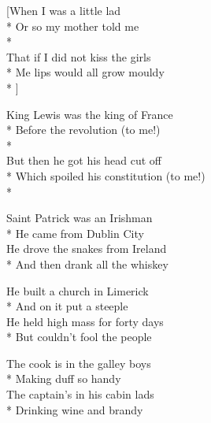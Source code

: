 
[When I was a little lad\\*
Or so my mother told me\\*
\vin{}\\
That if I did not kiss the girls\\*
Me lips would all grow mouldy\\*
\vin{}]


\versemark
King Lewis was the king of France\\*
Before the revolution (to me!)\\*
\vin{}\\
But then he got his head cut off\\*
Which spoiled his constitution (to me!)\\*
\vin{} 

\versemark
Saint Patrick was an Irishman\\*
He came from Dublin City\etc\\
He drove the snakes from Ireland\\*
And then drank all the whiskey\etc {}

\versemark
He built a church in Limerick\\*
And on it put a steeple\etc\\
He held high mass for forty days\\*
But couldn’t fool the people\etc {}

\versemark
The cook is in the galley boys\\*
Making duff so handy\etc\\
The captain’s in his cabin lads\\*
Drinking wine and brandy\etc {}

